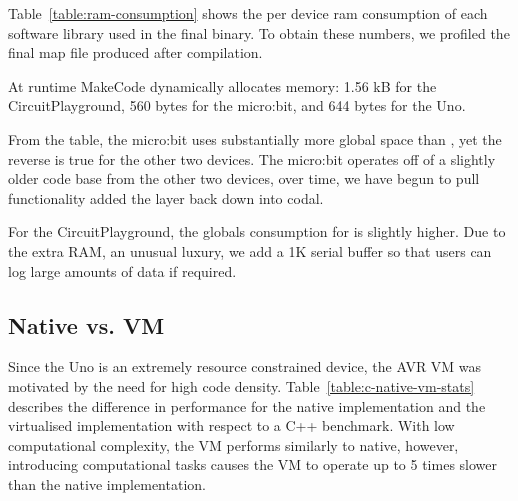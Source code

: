 Table~\ref{table:ram-consumption} shows the per device ram consumption of each software library used in the final \MC binary. To obtain these numbers, we profiled the final map file produced after compilation.

At runtime MakeCode dynamically allocates memory: 1.56 kB for the CircuitPlayground, 560 bytes for the micro:bit, and 644 bytes for the Uno.

From the table, the micro:bit uses substantially more global space than \CO, yet the reverse is true for the other two devices. The micro:bit operates off of a slightly older code base from the other two devices, over time, we have begun to pull functionality added the \MC layer back down into codal.

For the CircuitPlayground, the globals consumption for \CO is slightly higher. Due to the extra RAM, an unusual luxury, we add a 1K serial buffer so that users can log large amounts of data if required.




\subsection{\MC Native vs. \MC VM}

Since the Uno is an extremely resource constrained device, the AVR VM was motivated by the need for high code density. Table~\ref{table:c-native-vm-stats} describes the difference in performance for the native implementation and the virtualised implementation with respect to a C++ benchmark. With low computational complexity, the VM performs similarly to native, however, introducing computational tasks causes the VM to operate up to 5 times slower than the native implementation.

